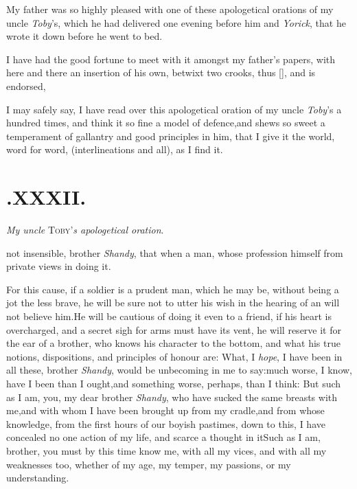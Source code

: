\documentclass{article}
\begin{document}
My father was so highly pleased with one of these apologetical
orations of my uncle \textit{Toby}’s, which he had delivered
one evening before him and \textit{Yorick}, that he wrote it down
before he went to bed.

I have had the good fortune to meet with it amongst my
father’s papers, with here and there an insertion of his own,
betwixt two crooks, thus [\quad \quad ], and is
endorsed,

\noindent
{}

\noindent
I may safely say, I have read over this apologetical oration of
my uncle \textit{Toby}’s a hundred times, and think it so fine
a model of defence,\tsk and shews so sweet a temperament of
gallantry and good principles in him, that I give it the world,
word for word, (interlineations and all), as I find it.

\section{.\enspace XXXII.}

\smallskip
\centerline{\textit{My  uncle} \textsc{Toby}’\textit{s apologetical  oration}.}

\vskip -9pt\etp

 not insensible, brother \textit{Shandy}, that when a man, whose
profession 
himself from private views in doing it.

For this cause, if a soldier is a prudent man, which he may be,
without being a jot the less brave, he will be sure not to utter
his wish in the hearing of an 
will not believe him.\tsh He will be cautious of doing it
even to a friend,\tsk
{}
if his heart is overcharged, and a secret
sigh for arms must have its vent, he will reserve it for the ear of
a brother, who knows his character to the bottom, and what his true
notions, dispositions, and principles of honour are: What, I \textit{hope}, I
have been in all these, brother \textit{Shandy}, would be unbecoming
in me to say:\tsh much worse, I know, have I been than I
ought,\tsk and something worse, perhaps, than I think: But such
as I am, you, my dear brother \textit{Shandy}, who have sucked the
same breasts with me,\tsk and with whom I have been
brought up from my cradle,\tsk and from whose knowledge, from the first hours of our
boyish pastimes, down to this, I have concealed no one action of my life, and scarce
a thought in it\tsh Such as I am, brother, you must by this time know me, with all
my vices, and with all my weaknesses too, whether of my age, my temper, my passions,
or my understanding.
\end{document}
